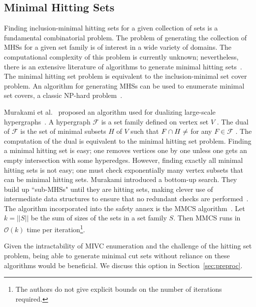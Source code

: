 \subsection{Minimal Hitting Sets}
Finding inclusion-minimal hitting sets for a given collection of sets is a fundamental combinatorial problem. The problem of generating the collection of MHSs for a given set family is of interest in a wide variety of domains. The computational complexity of this problem is currently unknown; nevertheless, there is an extensive literature of algorithms to generate minimal hitting sets~\cite{gainer2017minimal}. The minimal hitting set problem is equivalent to the inclusion-minimal set cover problem. An algorithm for generating MHSs can be used to enumerate minimal set covers, a classic NP-hard problem~\cite{karp1972reducibility}. 

Murakami et al.~ proposed an algorithm used for dualizing large-scale hypergraphs~\cite{murakami2013efficient}. A hypergraph $\mathcal{F}$ is a set family defined on vertex set $V$ . The dual of $\mathcal{F}$ is the set of minimal subsets $H$ of $V$ such that $F \cap H \not = \empty$ for any $F \in \mathcal{F}$ . The computation of the dual is equivalent to the minimal hitting set problem. Finding a minimal hitting set is easy; one removes vertices one by one unless one gets an empty intersection with some hyperedges. However, finding exactly all minimal hitting sets is not easy; one must check exponentially many vertex subsets that can be minimal hitting sets. Murakami introduced a bottom-up search. They build up ``sub-MHSs" until they are hitting sets, making clever use of intermediate data structures to ensure that no redundant checks are performed~\cite{gainer2017minimal}. The algorithm incorporated into the safety annex is the MMCS algorithm~\cite{murakami2013efficient}. Let $k = ||S||$ be the sum of sizes of the sets in a set family $S$. Then MMCS runs in $\mathcal{O}(k)$ time per iteration\footnote{The authors do not give explicit bounds on the number of iterations required.}.

Given the intractability of MIVC enumeration and the challenge of the hitting set problem, being able to generate minimal cut sets without reliance on these algorithms would be beneficial. We discuss this option in Section~\ref{sec:preproc}.


